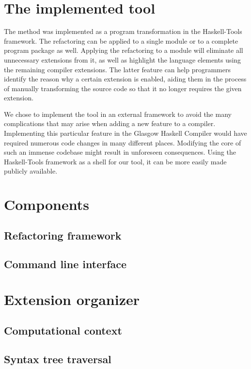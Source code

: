 \documentclass[main.tex]{subfiles}
\begin{document}
	
	\section{The implemented tool}
	
	The method was implemented as a program transformation in the Haskell-Tools framework. The refactoring can be applied to a single module or to a complete program package as well. Applying the refactoring to a module will eliminate all unnecessary extensions from it, as well as highlight the language elements using the remaining compiler extensions. The latter feature can help programmers identify the reason why a certain extension is enabled, aiding them in the process of manually transforming the source code so that it no longer requires the given extension.
	
	We chose to implement the tool in an external framework to avoid the many complications that may arise when adding a new feature to a compiler. Implementing this particular feature in the Glasgow Haskell Compiler would have required numerous code changes in many different places. Modifying the core of such an immense codebase might result in unforeseen consequences. Using the Haskell-Tools framework as a shell for our tool, it can be more easily made publicly available.
	
	\section{Components}
	
		\subsection{Refactoring framework}
		
		
		\subsection{Command line interface} 
		
	
	\section{Extension organizer}
	
		\subsection{Computational context}
		
	
		\subsection{Syntax tree traversal}
	
\end{document}
